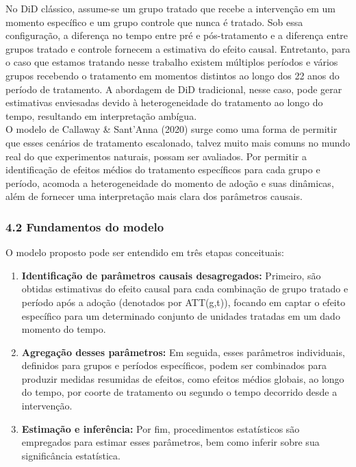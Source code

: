 \documentclass[
  brazilian,
  12pt,
  a4paper,
]{article}
\providecommand{\tightlist}{%
  \setlength{\itemsep}{0pt}\setlength{\parskip}{0pt}}
\begin{document}
No DiD clássico, assume-se um grupo tratado que recebe a intervenção em
um momento específico e um grupo controle que nunca é tratado. Sob essa
configuração, a diferença no tempo entre pré e pós-tratamento e a
diferença entre grupos tratado e controle fornecem a estimativa do
efeito causal. Entretanto, para o caso que estamos tratando nesse
trabalho existem múltiplos períodos e vários grupos recebendo o
tratamento em momentos distintos ao longo dos 22 anos do período de
tratamento. A abordagem de DiD tradicional, nesse caso, pode gerar
estimativas enviesadas devido à heterogeneidade do tratamento ao longo
do tempo, resultando em interpretação ambígua.\\
O modelo de Callaway \& Sant'Anna (2020) surge como uma forma de
permitir que esses cenários de tratamento escalonado, talvez muito mais
comuns no mundo real do que experimentos naturais, possam ser avaliados.
Por permitir a identificação de efeitos médios do tratamento específicos
para cada grupo e período, acomoda a heterogeneidade do momento de
adoção e suas dinâmicas, além de fornecer uma interpretação mais clara
dos parâmetros causais.

\subsubsection{\texorpdfstring{\textbf{4.2 Fundamentos do
modelo}}{4.2 Fundamentos do modelo}}\label{fundamentos-do-modelo}

O modelo proposto pode ser entendido em três etapas conceituais:

\begin{enumerate}
\def\labelenumi{\arabic{enumi}.}
\tightlist
\item
  \textbf{Identificação de parâmetros causais desagregados:} Primeiro,
  são obtidas estimativas do efeito causal para cada combinação de grupo
  tratado e período após a adoção (denotados por ATT(g,t)), focando em
  captar o efeito específico para um determinado conjunto de unidades
  tratadas em um dado momento do tempo.\\
\item
  \textbf{Agregação desses parâmetros:} Em seguida, esses parâmetros
  individuais, definidos para grupos e períodos específicos, podem ser
  combinados para produzir medidas resumidas de efeitos, como efeitos
  médios globais, ao longo do tempo, por coorte de tratamento ou segundo
  o tempo decorrido desde a intervenção.\\
\item
  \textbf{Estimação e inferência:} Por fim, procedimentos estatísticos
  são empregados para estimar esses parâmetros, bem como inferir sobre
  sua significância estatística.
\end{enumerate}
\end{document}
